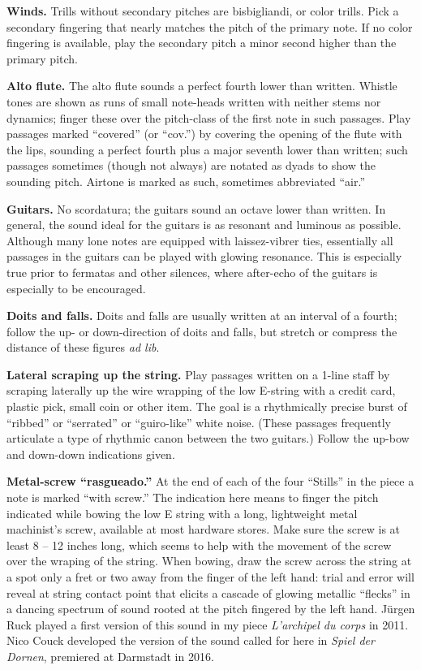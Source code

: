 \textbf{Winds.} Trills without secondary pitches are bisbigliandi, or color
trills. Pick a secondary fingering that nearly matches the pitch of the primary
note. If no color fingering is available, play the secondary pitch a minor
second higher than the primary pitch.

\textbf{Alto flute.} The alto flute sounds a perfect fourth lower than written.
Whistle tones are shown as runs of small note-heads written with neither stems
nor dynamics; finger these over the pitch-class of the first note in such
passages. Play passages marked ``covered'' (or ``cov.'') by covering the
opening of the flute with the lips, sounding a perfect fourth plus a major
seventh lower than written; such passages sometimes (though not always) are
notated as dyads to show the sounding pitch. Airtone is marked as such,
sometimes abbreviated ``air.''

\textbf{Guitars.} No scordatura; the guitars sound an octave lower than
written. In general, the sound ideal for the guitars is as resonant and
luminous as possible. Although many lone notes are equipped with laissez-vibrer
ties, essentially all passages in the guitars can be played with glowing
resonance. This is especially true prior to fermatas and other silences, where
after-echo of the guitars is especially to be encouraged.

\textbf{Doits and falls.} Doits and falls are usually written at an
interval of a fourth; follow the up- or down-direction of doits and falls,
but stretch or compress the distance of these figures \textit{ad lib}.

\textbf{Lateral scraping up the string.} Play passages written on a 1-line
staff by scraping laterally up the wire wrapping of the low E-string with a
credit card, plastic pick, small coin or other item. The goal is a rhythmically
precise burst of ``ribbed'' or ``serrated'' or ``guiro-like'' white noise.
(These passages frequently articulate a type of rhythmic canon between the two
guitars.) Follow the up-bow and down-down indications given.

\textbf{Metal-screw ``rasgueado.''} At the end of each of the four ``Stills''
in the piece a note is marked ``with screw.'' The indication here means to
finger the pitch indicated while bowing the low E string with a long,
lightweight metal machinist's screw, available at most hardware stores. Make
sure the screw is at least 8 -- 12 inches long, which seems to help with the
movement of the screw over the wraping of the string. When bowing, draw the
screw across the string at a spot only a fret or two away from the finger of
the left hand: trial and error will reveal at string contact point that elicits
a cascade of glowing metallic ``flecks'' in a dancing spectrum of sound rooted
at the pitch fingered by the left hand. Jürgen Ruck played a first version of
this sound in my piece \textit{L'archipel du corps} in 2011. Nico Couck
developed the version of the sound called for here in \textit{Spiel der
Dornen}, premiered at Darmstadt in 2016.


